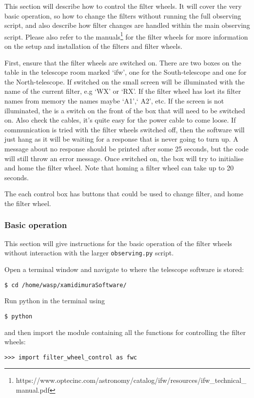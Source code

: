 \documentclass[a4paper,12pt]{article}
\newcommand{\observing}{\tt{observing.py}}
\begin{document}
This section will describe how to control the filter wheels. It will cover the very basic operation, so how to change the filters without running the full observing script, and also describe how filter changes are handled within the main observing script. Please also refer to the manuals{\footnote{https://www.optecinc.com/astronomy/catalog/ifw/resources/ifw\_technical\_manual.pdf}} for the filter wheels for more information on the setup and installation of the filters and filter wheels.

First, ensure that the filter wheels are switched on. There are two boxes on the table in the telescope room marked `ifw', one for the South-telescope and one for the North-telescope. If switched on the small screen will be illuminated with the name of the current filter, e.g `WX' or `RX'. If the filter wheel has lost its filter names from memory the names maybe `A1',` A2', etc. If the screen is not illuminated, the is a switch on the front of the box that will need to be switched on. Also check the cables, it's quite easy for the power cable to come loose. If communication is tried with the filter wheels switched off, then the software will just hang as it will be waiting for a response that is never going to turn up. A message about no response should be printed after some 25 seconds, but the code will still throw an error message. Once switched on, the box will try to initialise and home the filter wheel. {\color{blue}Note that homing a filter wheel can take up to 20 seconds.}

The each control box has buttons that could be used to change filter, and home the filter wheel.

\subsubsection{Basic operation}
\label{subsubsec:FWbasic}

This section will give instructions for the basic operation of the filter wheels without interaction with the larger {\observing} script.

Open a terminal window and navigate to where the telescope software is stored:
\begin{verbatim}
$ cd /home/wasp/xamidimuraSoftware/
\end{verbatim}
Run python in the terminal using
\begin{verbatim}
$ python
\end{verbatim}
and then import the module containing all the functions for controlling the filter wheels:
\begin{verbatim}
>>> import filter_wheel_control as fwc
\end{verbatim}
\end{document}
